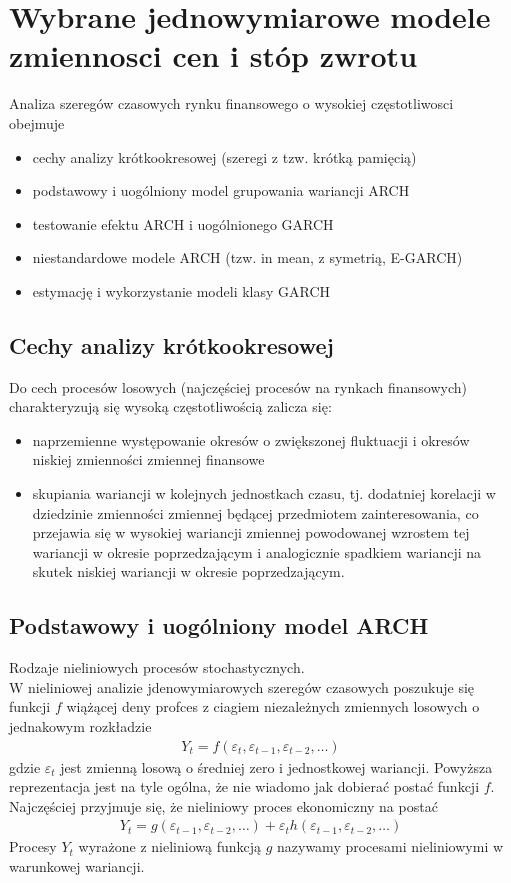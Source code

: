 \section{Wybrane jednowymiarowe modele zmiennosci cen i stóp zwrotu}
Analiza szeregów czasowych rynku finansowego o wysokiej częstotliwosci obejmuje
\begin{itemize}
\item cechy analizy krótkookresowej (szeregi z tzw. krótką pamięcią)
\item podstawowy i uogólniony model grupowania wariancji ARCH
\item testowanie efektu ARCH i uogólnionego GARCH
\item niestandardowe modele ARCH (tzw. in mean, z symetrią, E-GARCH)
\item estymację i wykorzystanie modeli klasy GARCH
\end{itemize}
\subsection{Cechy analizy krótkookresowej}
Do cech procesów losowych (najczęściej procesów na rynkach finansowych) charakteryzują się wysoką częstotliwością zalicza się:
\begin{itemize}
\item naprzemienne występowanie okresów o zwiększonej fluktuacji i okresów niskiej zmienności zmiennej finansowe
\item skupiania wariancji w kolejnych jednostkach czasu, tj. dodatniej korelacji w dziedzinie zmienności zmiennej będącej przedmiotem zainteresowania, co przejawia się w wysokiej wariancji zmiennej powodowanej wzrostem tej wariancji w okresie poprzedzającym i analogicznie spadkiem wariancji na skutek niskiej wariancji w okresie poprzedzającym.
\end{itemize}
\subsection{Podstawowy i uogólniony model ARCH}
Rodzaje nieliniowych procesów stochastycznych.\\
W nieliniowej analizie jdenowymiarowych szeregów czasowych poszukuje się funkcji $ f $ wiążącej deny profces z ciagiem niezależnych zmiennych losowych o jednakowym rozkładzie
\begin{gather*}
Y_t=f\left(\varepsilon_t,\varepsilon_{t-1},\varepsilon_{t-2},\dots\right )
\end{gather*}
gdzie $ \varepsilon_t $ jest zmienną losową o średniej zero i jednostkowej wariancji.
Powyższa reprezentacja jest na tyle ogólna, że nie wiadomo jak dobierać postać funkcji $ f $. Najczęściej przyjmuje się, że nieliniowy proces ekonomiczny na postać
\begin{gather*}
Y_t=g\left(\varepsilon_{t-1},\varepsilon_{t-2},\dots \right)+\varepsilon_th\left (\varepsilon_{t-1},\varepsilon_{t-2},\dots \right)
\end{gather*}
Procesy $ Y_t $ wyrażone z nieliniową funkcją $ g $ nazywamy procesami nieliniowymi w warunkowej wariancji.

